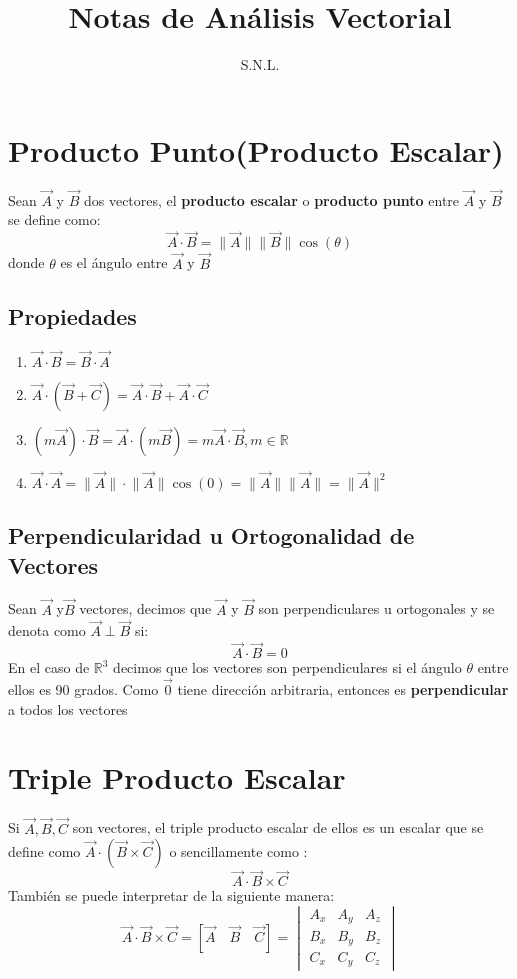 \documentclass[a4paper]{article}
\title{Notas de Análisis Vectorial}
\author{S.N.L.}
\date{}
\newcommand{\abs}[1]{\lVert #1 \rVert}
\begin{document}
\maketitle
\section{Producto Punto(Producto Escalar)}
Sean $\vec{A}$ y $\vec{B}$ dos vectores, el \textbf{producto escalar} o \textbf{producto punto} entre $\vec{A}$ y $\vec{B}$ se define como:
\[\vec{A}\cdot\vec{B}=\abs{\vec{A}}\abs{\vec{B}}\cos(\theta)\]
donde $\theta$ es el ángulo entre $\vec{A}$ y $\vec{B}$
\subsection{Propiedades}
\begin{enumerate}
\item{$\vec{A}\cdot\vec{B}=\vec{B}\cdot\vec{A}$}
\item{$\vec{A}\cdot(\vec{B}+\vec{C})=\vec{A}\cdot\vec{B}+\vec{A}\cdot\vec{C}$}
\item{$(m\vec{A})\cdot\vec{B}=\vec{A}\cdot(m\vec{B})=m\vec{A}\cdot\vec{B},m\in\mathbb{R}$}
\item{$\vec{A}\cdot\vec{A}=\abs{\vec{A}}\cdot\abs{\vec{A}}\cos(0)=\abs{\vec{A}}\abs{\vec{A}}=\abs{\vec{A}}^2$}
\end{enumerate}
\subsection{Perpendicularidad u Ortogonalidad de Vectores}
Sean $\vec{A}$ y$\vec{B}$ vectores, decimos que $\vec{A}$ y $\vec{B}$ son perpendiculares u ortogonales y se denota como $\vec{A}\perp\vec{B}$ si:
\[\vec{A}\cdot\vec{B}=0\]
En el caso de $\mathbb{R}^3$ decimos que los vectores son perpendiculares si el ángulo 
$\theta$ entre ellos es 90 grados.
Como $\vec{0}$ tiene dirección arbitraria, entonces es \textbf{perpendicular} a todos los vectores
\section{Triple Producto Escalar}
Si $\vec{A},\vec{B},\vec{C}$ son vectores, el triple producto escalar de ellos es un escalar
que se define como $\vec{A}\cdot(\vec{B}\times\vec{C})$ o sencillamente como :
\[\vec{A}\cdot\vec{B}\times\vec{C}\]
También se puede interpretar de la siguiente manera:
\[\vec{A}\cdot\vec{B}\times\vec{C}=[\vec{A}\quad\vec{B}\quad\vec{C}]=
\begin{vmatrix}
A_x & A_y & A_z\\
B_x & B_y & B_z\\
C_x & C_y & C_z
\end{vmatrix}
\]
\end{document}
